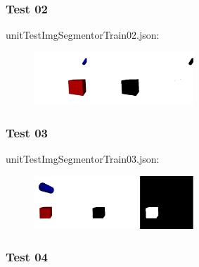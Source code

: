 \subsubsection{Test 02}

unitTestImgSegmentorTrain02.json:\\
\begin{scriptsize}
\begin{ttfamily}

\end{ttfamily}
\end{scriptsize}
\begin{center}
\begin{figure}[H]
\centering\includegraphics[width=6cm]{imgSegmentorTest02.png}
\end{figure}
\end{center}

\subsubsection{Test 03}

unitTestImgSegmentorTrain03.json:\\
\begin{scriptsize}
\begin{ttfamily}

\end{ttfamily}
\end{scriptsize}
\begin{center}
\begin{figure}[H]
\centering\includegraphics[width=6cm]{imgSegmentorTest03.png}
\end{figure}
\end{center}

\subsubsection{Test 04}

